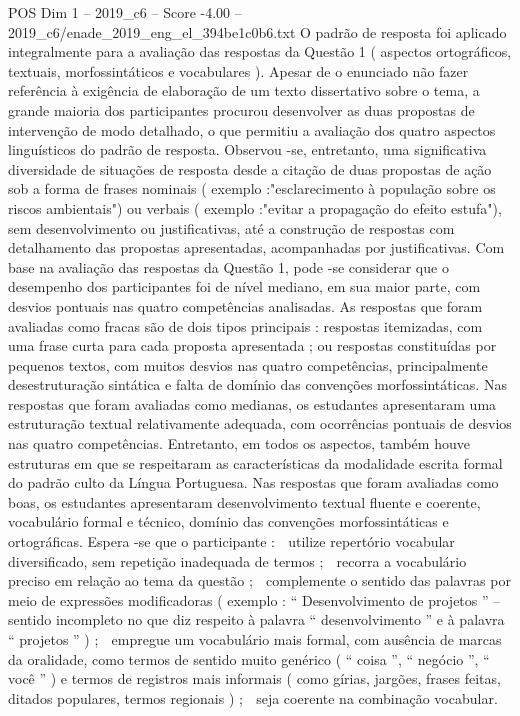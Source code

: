 \begin{textsample}{POS Dim 1 – 2019\_c6 – Score -4.00 – 2019\_c6/enade\_2019\_eng\_el\_394be1c0b6.txt}
O padrão de resposta foi aplicado integralmente para a avaliação das respostas da Questão 1 ( aspectos ortográficos, textuais, morfossintáticos e vocabulares ).
Apesar de o enunciado não fazer referência à exigência de elaboração de um texto dissertativo sobre o tema, a grande maioria dos participantes procurou desenvolver as duas propostas de intervenção de modo detalhado, o que permitiu a avaliação dos quatro aspectos linguísticos do padrão de resposta.
Observou -se, entretanto, uma significativa diversidade de situações de resposta desde a citação de duas propostas de ação sob a forma de frases nominais ( exemplo :"esclarecimento à população sobre os riscos ambientais") ou verbais ( exemplo :"evitar a propagação do efeito estufa"), sem desenvolvimento ou justificativas, até a construção de respostas com detalhamento das propostas apresentadas, acompanhadas por justificativas.
Com base na avaliação das respostas da Questão 1, pode -se considerar que o desempenho dos participantes foi de nível mediano, em sua maior parte, com desvios pontuais nas quatro competências analisadas.
As respostas que foram avaliadas como fracas são de dois tipos principais : respostas itemizadas, com uma frase curta para cada proposta apresentada ; ou respostas constituídas por pequenos textos, com muitos desvios nas quatro competências, principalmente desestruturação sintática e falta de domínio das convenções morfossintáticas.
Nas respostas que foram avaliadas como medianas, os estudantes apresentaram uma estruturação textual relativamente adequada, com ocorrências pontuais de desvios nas quatro competências.
Entretanto, em todos os aspectos, também houve estruturas em que se respeitaram as características da modalidade escrita formal do padrão culto da Língua Portuguesa.
Nas respostas que foram avaliadas como boas, os estudantes apresentaram desenvolvimento textual fluente e coerente, vocabulário formal e técnico, domínio das convenções morfossintáticas e ortográficas.
Espera -se que o participante :  utilize repertório vocabular diversificado, sem repetição inadequada de termos ;  recorra a vocabulário preciso em relação ao tema da questão ;  complemente o sentido das palavras por meio de expressões modificadoras ( exemplo : “ Desenvolvimento de projetos ” – sentido incompleto no que diz respeito à palavra “ desenvolvimento ” e à palavra “ projetos ” ) ;  empregue um vocabulário mais formal, com ausência de marcas da oralidade, como termos de sentido muito genérico ( “ coisa ”, “ negócio ”, “ você ” ) e termos de registros mais informais ( como gírias, jargões, frases feitas, ditados populares, termos regionais ) ;  seja coerente na combinação vocabular.

\end{textsample}

